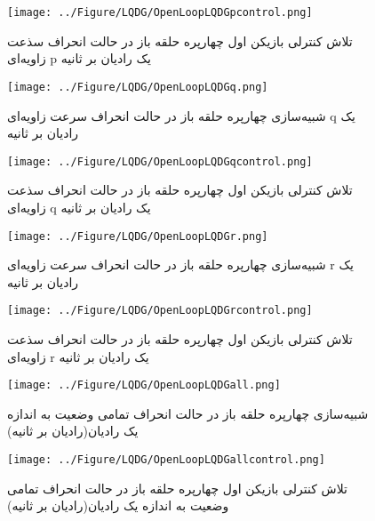 \begin{figure}[H]
	\texttt{[image: ../Figure/LQDG/OpenLoopLQDGpcontrol.png]}
	\centering
	\caption{تلاش کنترلی بازیکن اول چهارپره حلقه باز در حالت انحراف سذعت زاویه‌ای p 
		یک رادیان بر ثانیه}
\end{figure}
\begin{figure}[H]
\texttt{[image: ../Figure/LQDG/OpenLoopLQDGq.png]}
\centering
\caption{شبیه‌‌سازی چهارپره حلقه باز در حالت انحراف سرعت زاویه‌ای q 
	یک رادیان بر ثانیه}
\end{figure}
\begin{figure}[H]
\texttt{[image: ../Figure/LQDG/OpenLoopLQDGqcontrol.png]}
\centering
\caption{تلاش کنترلی بازیکن اول چهارپره حلقه باز در حالت انحراف سذعت زاویه‌ای q 
	یک رادیان بر ثانیه}
\end{figure}
\begin{figure}[H]
\texttt{[image: ../Figure/LQDG/OpenLoopLQDGr.png]}
\centering
\caption{شبیه‌‌سازی چهارپره حلقه باز در حالت انحراف سرعت زاویه‌ای r 
	یک رادیان بر ثانیه}
\end{figure}
\begin{figure}[H]
\texttt{[image: ../Figure/LQDG/OpenLoopLQDGrcontrol.png]}
\centering
\caption{تلاش کنترلی بازیکن اول چهارپره حلقه باز در حالت انحراف سذعت زاویه‌ای r 
	یک رادیان بر ثانیه}
\end{figure}
\begin{figure}[H]
	\texttt{[image: ../Figure/LQDG/OpenLoopLQDGall.png]}
	\centering
	\caption{شبیه‌‌سازی چهارپره حلقه باز در حالت انحراف  تمامی وضعیت به اندازه یک رادیان(رادیان بر ثانیه)}
\end{figure}
\begin{figure}[H]
	\texttt{[image: ../Figure/LQDG/OpenLoopLQDGallcontrol.png]}
	\centering
	\caption{تلاش کنترلی بازیکن اول چهارپره حلقه باز در حالت انحراف تمامی وضعیت به اندازه یک رادیان(رادیان بر ثانیه)  }
\end{figure}
